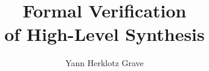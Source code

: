 \documentclass[
  fontsize=12pt,
  twoside=semi,
  bibliography=totoc,
  DIV=11,
  ]{scrbook}
\title{Formal Verification \\ of High-Level Synthesis}
\author{Yann Herklotz Grave}
\begin{document}












\glsresetall


















\end{document}
